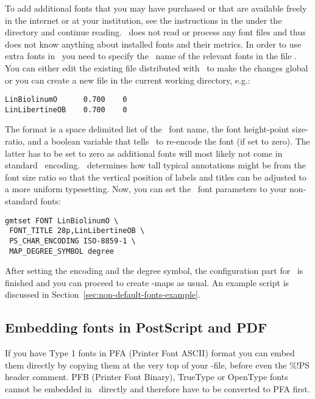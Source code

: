 To add additional fonts that you may have purchased or that are
available freely in the internet or at your institution, see the
instructions in the  under the
 directory and continue reading.
%
\GMT\ does not read or process any font files and thus does not
know anything about installed fonts and their metrics. In order to
use extra fonts in \GMT\ you need to specify the \PS\ name of the
relevant fonts in the file . You
can either edit the existing file distributed with \GMT\ to make
the changes global or you can create a new file in the current
working directory, e.g.:
%
\begin{verbatim}
LinBiolinumO      0.700    0
LinLibertineOB    0.700    0
\end{verbatim}
%
The format is a space delimited list of the \PS\ font name, the
font height-point size-ratio, and a boolean variable that tells
\GMT\ to re-encode the font (if set to zero). The latter has to be
set to zero as additional fonts will most likely not come in
standard \PS\ encoding. \GMT\ determines how tall typical
annotations might be from the font size ratio so that the vertical
position of labels and titles can be adjusted to a more uniform
typesetting. Now, you can set the \GMT\ font parameters to your
non-standard fonts:
%
\begin{verbatim}
gmtset FONT LinBiolinumO \
 FONT_TITLE 28p,LinLibertineOB \
 PS_CHAR_ENCODING ISO-8859-1 \
 MAP_DEGREE_SYMBOL degree
\end{verbatim}
%
After setting the encoding and the degree symbol, the
configuration part for \GMT\ is finished and you can proceed to
create \GMT-maps as usual. An example script is discussed in
Section~\ref{sec:non-default-fonts-example}.


\subsection{Embedding fonts in PostScript and PDF}

If you have Type 1 fonts in PFA (Printer Font ASCII) format you
can embed them directly by copying them at the very top of your
\PS-file, before even the \%!PS header comment. PFB (Printer Font
Binary), TrueType or OpenType fonts cannot be embedded in \PS\
directly and therefore have to be converted to PFA first.

